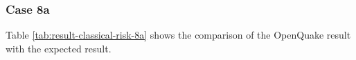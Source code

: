 \subsubsection{Case 8a}




Table \ref{tab:result-classical-risk-8a} shows the comparison of the OpenQuake result with the expected result.

